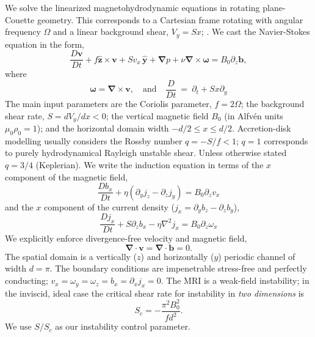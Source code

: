 \documentclass[aps,prl,reprint,superscriptaddress]{revtex4-1}
\newcommand{\SSC}{S/S_{c}}
\begin{document}
We solve the linearized magnetohydrodynamic equations in rotating plane-Couette geometry.
This corresponds to a Cartesian frame rotating with angular frequency $\Omega$ and a linear background shear, $V_{y} = Sx$; \citep[see][]{2015RSPSA.47140699V}.
We cast the Navier-Stokes equation in the form,
\begin{equation}
  \label{eq:mhd}
  \frac{D \boldsymbol{v}}{Dt} + f \boldsymbol{\hat{z}} \times \boldsymbol{v} + S v_x\, \boldsymbol{\hat{y}} + \boldsymbol{\nabla}{p} + \nu \boldsymbol{\nabla} \times \boldsymbol{\omega} = B_{0} \partial_{z} \boldsymbol{b},
\end{equation}
where
\begin{equation}
\boldsymbol{\omega} = \boldsymbol{\nabla} \times \boldsymbol{v}, \quad \text{and} \quad \frac{D}{Dt} \ = \ \partial_{t} + S x \partial_{y}
\end{equation}
The main input parameters are the Coriolis parameter, $f = 2 \Omega$; the background shear rate, $S = dV_{y}/dx < 0$;  the vertical magnetic field $B_{0}$ (in Alfv\'{e}n units $\mu_{0} \rho_{0} = 1$); and the horizontal domain width $-d/2 \le x \le d/2$.
Accretion-disk modelling usually considers the Rossby number $q = -S/f < 1$; $q=1$ corresponds to purely hydrodynamical Rayleigh unstable shear.
Unless otherwise stated $q = 3/4$ (Keplerian).
We write the induction equation in terms of the $x$ component of the magnetic field,
\begin{equation}
  \label{eq:Bx}
  \frac{D b_x}{Dt} + \eta (\partial_y j_z - \partial_z j_y) = B_0 \partial_z v_x
\end{equation}
and the $x$ component of the current density ($j_{x} = \partial_{y}b_{z} - \partial_{z} b_{y}$),
\begin{equation}
  \label{eq:Jx}
  \frac{D j_x}{Dt} + S \partial_z b_x - \eta \nabla^2 j_x = B_0 \partial_z \omega_x
\end{equation}
We explicitly enforce divergence-free velocity and magnetic field,
\begin{equation}
  \label{eq:divu}
  \boldsymbol{\nabla} \cdot \boldsymbol{v} = \boldsymbol{\nabla} \cdot \boldsymbol{b} = 0.
\end{equation}
The spatial domain is a vertically ($z$) and horizontally ($y$) periodic channel of width $d = \pi$. 
The boundary conditions are impenetrable stress-free and perfectly conducting; $v_{x} = \omega_{y} = \omega_{z} = b_{x} = \partial_{x}j_{x} = 0$. 
The MRI is a weak-field instability; in the inviscid, ideal case the critical shear rate for instability in \textit{two dimensions} is
\begin{equation}
  \label{eq:Sc}
  S_c = -\frac{\pi^2 B_{0}^2}{f d^2}.
\end{equation}
We use $\SSC$ as our instability control parameter. 
\end{document}
